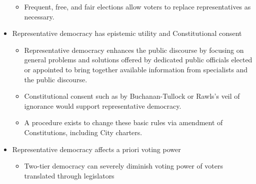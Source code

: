 \begin{itemize}
\begin{itemize}
        \item Frequent, free, and fair elections allow voters to replace representatives as necessary.
    \end{itemize}

    \item Representative democracy has epistemic utility and Constitutional consent
    \begin{itemize}
        \item Representative democracy enhances the public discourse by focusing on general problems and solutions offered by dedicated public officials elected or appointed to bring together available information from specialists and the public discourse.

        \item Constitutional consent such as by Buchanan-Tullock or Rawls's veil of ignorance would support representative democracy.

        \item A procedure exists to change these basic rules via amendment of Constitutions, including City charters.
    \end{itemize}

    \item Representative democracy affects a priori voting power
    \begin{itemize}
        \item Two-tier democracy can severely diminish voting power of voters translated through legislators
    \end{itemize}

\end{itemize}
